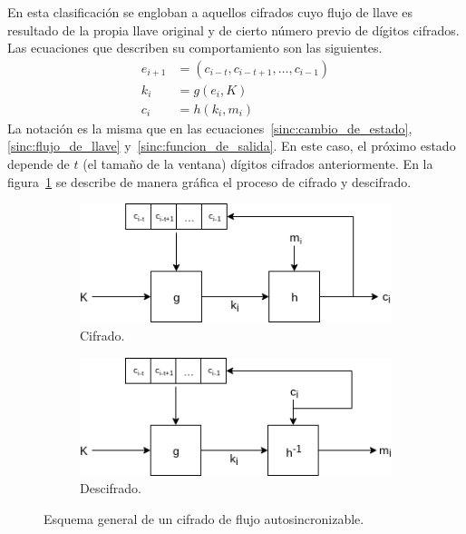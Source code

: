 En esta clasificación se engloban a aquellos cifrados cuyo flujo de llave es
resultado de la propia llave original y de cierto número previo de dígitos
cifrados. Las ecuaciones que describen su comportamiento son las siguientes.
\begin{align}
  \label{asinc:cambio_de_estado}
  e_{i+1} &= (c_{i - t}, c_{i - t + 1}, \dots, c_{i - 1}) \\
  \label{asinc:flujo_de_llave}
  k_i &= g(e_i, K) \\
  \label{asinc:funcion_de_salida}
  c_i &= h(k_i, m_i)
\end{align}
La notación es la misma que en las ecuaciones~\ref{sinc:cambio_de_estado},
\ref{sinc:flujo_de_llave} y~\ref{sinc:funcion_de_salida}. En este caso, el
próximo estado depende de $ t $ (el tamaño de la ventana) dígitos cifrados
anteriormente. En la figura~\ref{flujo_asincrono} se describe de manera
gráfica el proceso de cifrado y descifrado.

\begin{figure}
  \centering
  \begin{subfigure}{0.45\textwidth}
    \begin{center}
      \includegraphics[width=0.9\linewidth]{diagramas/asincrono_cifrado.png}
      \caption{Cifrado.}
    \end{center}
  \end{subfigure}
  \begin{subfigure}{0.45\textwidth}
    \begin{center}
      \includegraphics[width=0.9\linewidth]{diagramas/asincrono_descifrado.png}
      \caption{Descifrado.}
    \end{center}
  \end{subfigure}
  \caption{Esquema general de un cifrado de flujo autosincronizable.}
  \label{flujo_asincrono}
\end{figure}

